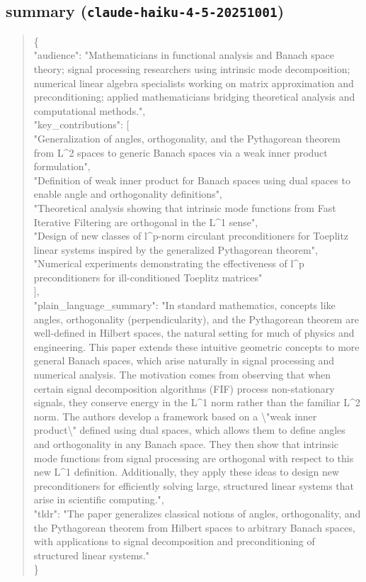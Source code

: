 \documentclass[11pt]{article}
\begin{document}
\subsection*{summary (\texttt{claude-haiku-4-5-20251001})}
\begin{quote}\small\ttfamily\raggedright
\{\\
  "audience": "Mathematicians in functional analysis and Banach space theory; signal processing researchers using intrinsic mode decomposition; numerical linear algebra specialists working on matrix approximation and preconditioning; applied mathematicians bridging theoretical analysis and computational methods.",\\
  "key\_contributions": [\\
    "Generalization of angles, orthogonality, and the Pythagorean theorem from L\^{}2 spaces to generic Banach spaces via a weak inner product formulation",\\
    "Definition of weak inner product for Banach spaces using dual spaces to enable angle and orthogonality definitions",\\
    "Theoretical analysis showing that intrinsic mode functions from Fast Iterative Filtering are orthogonal in the L\^{}1 sense",\\
    "Design of new classes of l\^{}p-norm circulant preconditioners for Toeplitz linear systems inspired by the generalized Pythagorean theorem",\\
    "Numerical experiments demonstrating the effectiveness of l\^{}p preconditioners for ill-conditioned Toeplitz matrices"\\
  ],\\
  "plain\_language\_summary": "In standard mathematics, concepts like angles, orthogonality (perpendicularity), and the Pythagorean theorem are well-defined in Hilbert spaces, the natural setting for much of physics and engineering. This paper extends these intuitive geometric concepts to more general Banach spaces, which arise naturally in signal processing and numerical analysis. The motivation comes from observing that when certain signal decomposition algorithms (FIF) process non-stationary signals, they conserve energy in the L\^{}1 norm rather than the familiar L\^{}2 norm. The authors develop a framework based on a \textbackslash{}"weak inner product\textbackslash{}" defined using dual spaces, which allows them to define angles and orthogonality in any Banach space. They then show that intrinsic mode functions from signal processing are orthogonal with respect to this new L\^{}1 definition. Additionally, they apply these ideas to design new preconditioners for efficiently solving large, structured linear systems that arise in scientific computing.",\\
  "tldr": "The paper generalizes classical notions of angles, orthogonality, and the Pythagorean theorem from Hilbert spaces to arbitrary Banach spaces, with applications to signal decomposition and preconditioning of structured linear systems."\\
\}\\
\end{quote}
\end{document}
